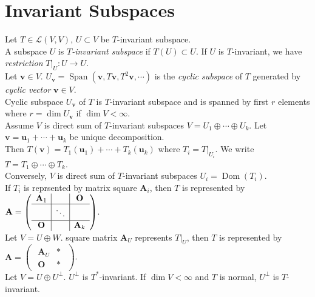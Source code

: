 \documentclass{article}
\theoremstyle{definition}
\DeclareMathOperator{\Span}{Span}
\DeclareMathOperator{\Dom}{Dom}
\begin{document}
\section{Invariant Subspaces}
Let $T\in\mathscr{L}(V,V)$, $U\subset V$ be $T$-invariant subspace.\\

A subspace $U$ is \textit{$T$-invariant subspace} if $T(U)\subset U$. If $U$ is $T$-invariant, we have \textit{restriction} $T\vert_{U}:U\longrightarrow U$.\\
Let $\mathbf{v}\in V$. $U_{\mathbf{v}}=\Span(\mathbf{v},T\mathbf{v},T^{2}\mathbf{v},\cdots)$ is the \textit{cyclic subspace} of $T$ generated by \textit{cyclic vector} $\mathbf{v}\in V$.\\
Cyclic subspace $U_{\mathbf{v}}$ of $T$ is $T$-invariant subspace and is spanned by first $r$ elements where $r=\dim U_{\mathbf{v}}$ if $\dim{V}<\infty$.\\
Assume $V$ is direct sum of $T$-invariant subspaces $V=U_{1}\oplus\cdots\oplus U_{k}$. Let $\mathbf{v}=\mathbf{u}_{1}+\cdots+\mathbf{u}_{k}$ be unique decomposition.\\
Then $T(\mathbf{v})=T_{1}(\mathbf{u}_{1})+\cdots+T_{k}(\mathbf{u}_{k})$ where $T_{i}=T\vert_{U_{i}}$. We write $T=T_{1}\oplus\cdots\oplus T_{k}$.\\
Conversely, $V$ is direct sum of $T$-invariant subspaces $U_{i}=\Dom(T_{i})$.\\
If $T_{i}$ is reprsented by matrix square $\mathbf{A}_{i}$, then $T$ is represented by $\mathbf{A}=\begin{pmatrix}
    \begin{array}{c|c|c}
        \mathbf{A}_{1} & & \mathbf{O}\\
        \hline
        & \ddots\\
        \hline
        \mathbf{O} & & \mathbf{A}_{k}
    \end{array}
\end{pmatrix}$.\\
Let $V=U\oplus W$. square matrix $\mathbf{A}_{U}$ represents $T\vert_{U}$, then $T$ is represented by $\mathbf{A}=\begin{pmatrix}
    \begin{array}{c|c}
        \mathbf{A}_{U} & *\\
        \hline
        \mathbf{O} & *
    \end{array}
\end{pmatrix}$.\\
Let $V=U\oplus U^{\perp}$. $U^{\perp}$ is $T^{*}$-invariant. If $\dim{V}<\infty$ and $T$ is normal, $U^{\perp}$ is $T$-invariant.\\
\end{document}
